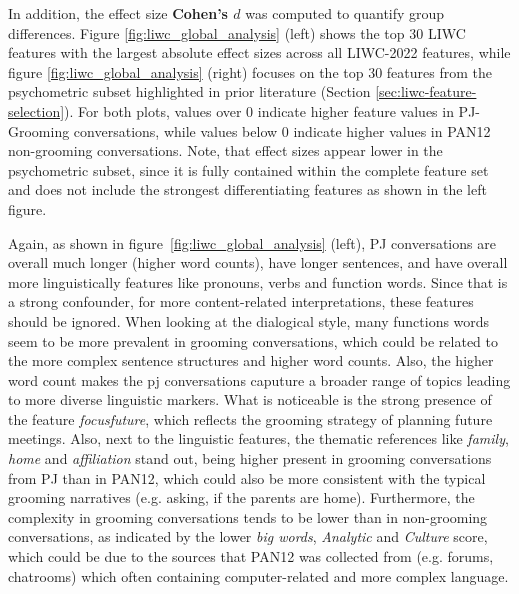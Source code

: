 In addition, the effect size \textbf{Cohen’s $d$} \cite{cohen1988} was computed to quantify group differences. Figure \ref{fig:liwc_global_analysis} (left) shows the top 30 LIWC features with the largest absolute effect sizes across all LIWC-2022 features, while figure \ref{fig:liwc_global_analysis} (right) focuses on the top 30 features from the psychometric subset highlighted in prior literature (Section \ref{sec:liwc-feature-selection}). For both plots, values over 0 indicate higher feature values in PJ-Grooming conversations, while values below 0 indicate higher values in PAN12 non-grooming conversations. Note, that effect sizes appear lower in the psychometric subset, since it is fully contained within the complete feature set and does not include the strongest differentiating features as shown in the left figure. 

Again, as shown in figure~\ref{fig:liwc_global_analysis} (left), PJ conversations are overall much longer (higher word counts), have longer sentences, and have overall more linguistically features like pronouns, verbs and function words. Since that is a strong confounder, for more content-related interpretations, these features should be ignored. When looking at the dialogical style, many functions words seem to be more prevalent in grooming conversations, which could be related to the more complex sentence structures and higher word counts. Also, the higher word count makes the pj conversations caputure a broader range of topics leading to more diverse linguistic markers.
What is noticeable is the strong presence of the feature \textit{focusfuture}, which reflects the grooming strategy of planning future meetings. Also, next to the linguistic features, the thematic references like \textit{family}, \textit{home} and \textit{affiliation} stand out, being higher present in grooming conversations from PJ than in PAN12, which could also be more consistent with the typical grooming narratives (e.g. asking, if the parents are home). Furthermore, the complexity in grooming conversations tends to be lower than in non-grooming conversations, as indicated by the lower \textit{big words}, \textit{Analytic} and \textit{Culture} score, which could be due to the sources that PAN12 was collected from (e.g. forums, chatrooms) which often containing computer-related and more complex language.

